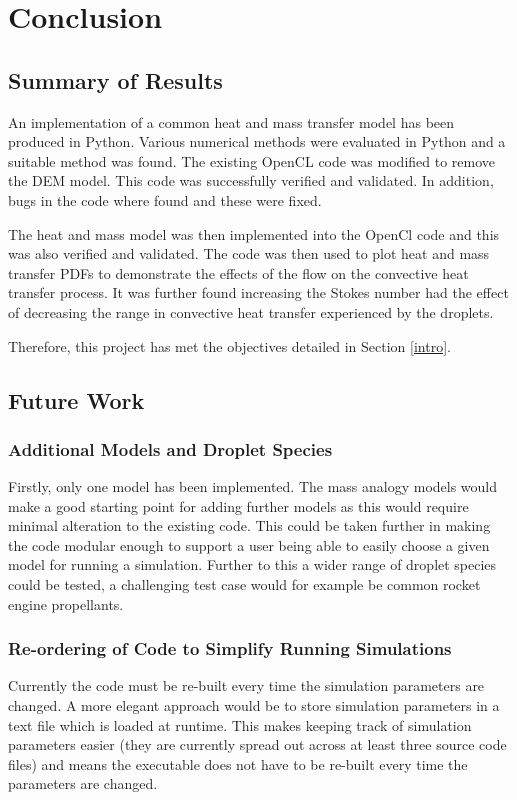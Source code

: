 \documentclass[../Interim_Report_Master]{subfiles}
\begin{document}
\hypertarget{con}{\section{Conclusion}\label{con}}
\subsection{Summary of Results}
An implementation of a common heat and mass transfer model has been produced in Python. Various numerical methods were evaluated in Python and a suitable method was found. The existing OpenCL code was modified to remove the DEM model. This code was successfully verified and validated. In addition, bugs in the code where found and these were fixed. 

The heat and mass model was then implemented into the OpenCl code and this was also verified and validated. The code was then used to plot heat and mass transfer PDFs to demonstrate the effects of the flow on the convective heat transfer process. It was further found increasing the Stokes number had the effect of decreasing the range in convective heat transfer experienced by the droplets.

Therefore, this project has met the objectives detailed in Section \ref{intro}.

\subsection{Future Work}
\subsubsection{Additional Models and Droplet Species}
Firstly, only one model has been implemented. The mass analogy models would make a good starting point for adding further models as this would require minimal alteration to the existing code. This could be taken further in making the code modular enough to support a user being able to easily choose a given model for running a simulation. Further to this a wider range of droplet species could be tested, a challenging test case would for example be common rocket engine propellants. 

\subsubsection{Re-ordering of Code to Simplify Running Simulations}
Currently the code must be re-built every time the simulation parameters are changed. A more elegant approach would be to store simulation parameters in a text file which is loaded at runtime. This makes keeping track of simulation parameters easier (they are currently spread out across at least three source code files) and means the executable does not have to be re-built every time the parameters are changed.
\end{document}
